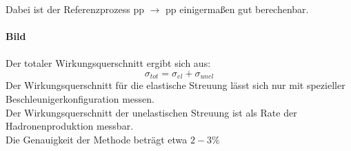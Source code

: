 Dabei ist der Referenzprozess pp $\longrightarrow$ pp einigermaßen gut 
berechenbar.\\
\\
\textbf{Bild}\\
\\
Der totaler Wirkungsquerschnitt ergibt sich aus:
\[ \sigma_{tot} = \sigma_{el} + \sigma_{unel} \] 
Der Wirkungsquerschnitt für die elastische Streuung lässt sich nur mit 
spezieller Beschleunigerkonfiguration messen. \\
Der Wirkungsquerschnitt der unelastischen Streuung ist als Rate der 
Hadronenproduktion messbar. \\
Die Genauigkeit der Methode beträgt etwa $2-3\%$
